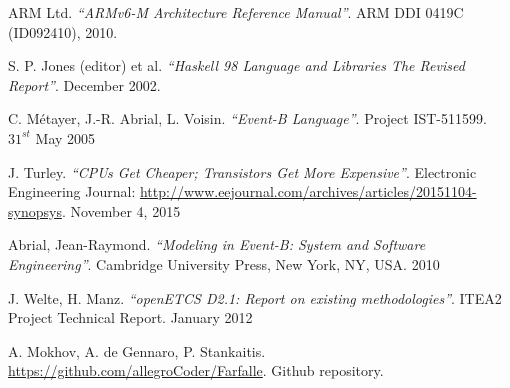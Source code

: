 \documentclass[conference]{IEEEtran}
\begin{document}
\begin{thebibliography}{10}
	ARM Ltd. \emph{``ARMv6-M Architecture Reference Manual''}. 
	ARM DDI 0419C (ID092410), 2010.
	
	S. P. Jones (editor) et al.
	\emph{``Haskell 98 Language and Libraries The Revised Report''}.
	December 2002.
	
	C. Métayer, J.-R. Abrial, L. Voisin. \emph{``Event-B Language''}. 
	Project IST-511599. $31^{st}$ May 2005
	
	J. Turley. \emph{``CPUs Get Cheaper; Transistors Get More Expensive''}. Electronic
	Engineering Journal: \url{http://www.eejournal.com/archives/articles/20151104-synopsys}.
	November 4, 2015
	
    Abrial, Jean-Raymond. \emph{``Modeling in Event-B: System and Software Engineering''}.
    Cambridge University Press, New York, NY, USA.
    2010
    
	J. Welte, H. Manz. \emph{``openETCS D2.1: Report on existing methodologies''}.
	ITEA2 Project Technical Report.
	January 2012
	
	A. Mokhov, A. de Gennaro, P. Stankaitis. \url{https://github.com/allegroCoder/Farfalle}. Github repository.
    
\end{thebibliography}
\end{document}
